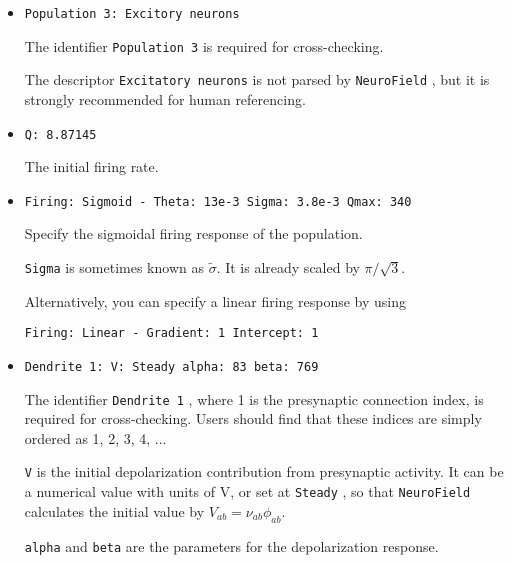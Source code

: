 \documentclass[12pt,a4paper]{article}
\newcommand{\type}[1]{ {\small\small\tt #1} }
\newcommand{\NF}[0]{ \type{NeuroField}}
\begin{document}
\begin{description}
	\begin{itemize}
	\item
	\begin{lstlisting}
Population 3: Excitory neurons
	\end{lstlisting}
	The identifier \type{Population 3} is required for cross-checking.
	
	The descriptor \type{Excitatory neurons} is not parsed by \NF, but it is strongly recommended for human referencing.
	\item
	\begin{lstlisting}
Q: 8.87145
	\end{lstlisting}
	The initial firing rate.
	\item
	\begin{lstlisting}
Firing: Sigmoid - Theta: 13e-3 Sigma: 3.8e-3 Qmax: 340
	\end{lstlisting}
	Specify the sigmoidal firing response of the population.

	\type{Sigma} is sometimes known as \(\tilde{\sigma}\). It is already scaled by \(\pi/\sqrt{3}\).

	Alternatively, you can specify a linear firing response by using
	\begin{lstlisting}
Firing: Linear - Gradient: 1 Intercept: 1
	\end{lstlisting}

	\item
	\begin{lstlisting}
Dendrite 1: V: Steady alpha: 83 beta: 769
	\end{lstlisting}
	The identifier \type{Dendrite 1}, where 1 is the presynaptic connection index, is required for cross-checking. Users should find that these indices are simply ordered as 1, 2, 3, 4, ...
	
	\type{V} is the initial depolarization contribution from presynaptic activity. It can be a numerical value with units of V, or set at \type{Steady}, so that \NF calculates the initial value by \(V_{ab}=\nu_{ab}\phi_{ab}\).

	\type{alpha} and \type{beta} are the parameters for the depolarization response.
	\end{itemize}
\end{description}
\end{document}
